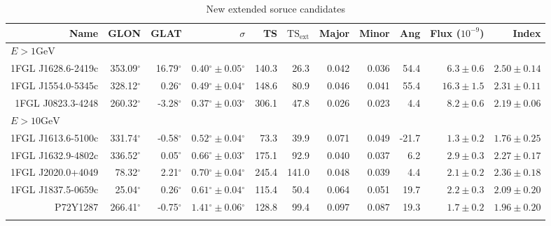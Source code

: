 \documentclass[preprint]{aastex}
\newcommand{\gev}{\text{GeV}\xspace}
\newcommand{\tsext}{\ensuremath{\text{TS}_\text{ext}}\xspace}
\renewcommand{\deg}{\ensuremath{^\circ}\xspace}
\begin{document}
\clearpage
\begin{table}
    \begin{centering}
      \begin{tabular}{rrrrrrrrrrr}
        Name               &        GLON &        GLAT  &                $\sigma$ &       TS &   $\tsext$ &  Major &  Minor &    Ang &       Flux ($10^{-9}$) &      Index \\
        \hline
        \multicolumn{11}{l}{$E > 1\gev$} \\
        \hline
        1FGL J1628.6-2419c &   353.09\deg&    16.79\deg & $  0.40\deg\pm0.05\deg$ &    140.3 &       26.3 &  0.042 &  0.036 &   54.4 & $    6.3\pm0.6$ &$   2.50\pm0.14$ \\
        1FGL J1554.0-5345c &   328.12\deg&     0.26\deg & $  0.49\deg\pm0.04\deg$ &    148.6 &       80.9 &  0.046 &  0.041 &   55.4 & $   16.3\pm1.5$ &$   2.31\pm0.11$ \\
        1FGL J0823.3-4248  &   260.32\deg&    -3.28\deg & $  0.37\deg\pm0.03\deg$ &    306.1 &       47.8 &  0.026 &  0.023 &    4.4 & $    8.2\pm0.6$ &$   2.19\pm0.06$ \\
        \hline
        \multicolumn{11}{l}{$E > 10\gev$} \\
        \hline
        1FGL J1613.6-5100c &   331.74\deg&    -0.58\deg & $  0.52\deg\pm0.04\deg$ &     73.3 &       39.9 &  0.071 &  0.049 &  -21.7 & $    1.3\pm0.2$ &$   1.76\pm0.25$ \\
        1FGL J1632.9-4802c &   336.52\deg&     0.05\deg & $  0.66\deg\pm0.03\deg$ &    175.1 &       92.9 &  0.040 &  0.037 &    6.2 & $    2.9\pm0.3$ &$   2.27\pm0.17$ \\
        1FGL J2020.0+4049  &    78.32\deg&     2.21\deg & $  0.70\deg\pm0.04\deg$ &    245.4 &      141.0 &  0.048 &  0.039 &    4.4 & $    2.1\pm0.2$ &$   2.36\pm0.18$ \\
        1FGL J1837.5-0659c &    25.04\deg&     0.26\deg & $  0.61\deg\pm0.04\deg$ &    115.4 &       50.4 &  0.064 &  0.051 &   19.7 & $    2.2\pm0.3$ &$   2.09\pm0.20$ \\
        P72Y1287           &   266.41\deg&    -0.75\deg & $  1.41\deg\pm0.06\deg$ &    128.8 &       99.4 &  0.097 &  0.087 &   19.3 & $    1.7\pm0.2$ &$   1.96\pm0.20$ \\
        \hline
      \label{new_ext_srcs}
      \end{tabular}
      \caption{New extended soruce candidates}
    \end{centering}
\end{table}
\end{document}
